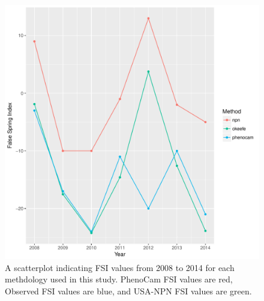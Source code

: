 \documentclass{article}\usepackage[]{graphicx}\usepackage[]{color}
\makeatletter
\def\maxwidth{ %
  \ifdim\Gin@nat@width>\linewidth
    \linewidth
  \else
    \Gin@nat@width
  \fi
}
\makeatother
\begin{document}


\begin{figure}[H]
\includegraphics[width=\maxwidth]{figure/fsifig-1} \caption[A scatterplot indicating FSI values from 2008 to 2014 for each methdology used in this study]{A scatterplot indicating FSI values from 2008 to 2014 for each methdology used in this study. PhenoCam FSI values are red, Observed FSI values are blue, and USA-NPN FSI values are green.}\label{fig:fsifig}
\end{figure}
\end{document}
